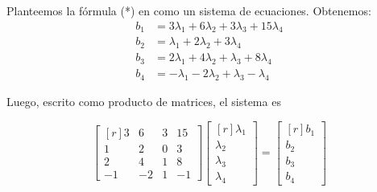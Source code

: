 \documentclass[handout]{beamer} %
\begin{document}
    \begin{frame}
        Planteemos la fórmula (*) en como un sistema de ecuaciones. Obtenemos:
        \begin{align*}
            b_1&=3\lambda_1+6\lambda_2+3\lambda_3+15\lambda_4\\
            b_2&=\lambda_1+2\lambda_2+3\lambda_4\\
            b_3&=2\lambda_1+4\lambda_2+ \lambda_3+8\lambda_4\\
            b_4&=-\lambda_1-2\lambda_2+\lambda_3-\lambda_4
        \end{align*}
        
        \pause Luego, escrito como producto de matrices, el sistema es

        \begin{equation*}
            \begin{bmatrix*}[r]    
        3&6&3&15\\
        1&2&0&3\\
        2&4&1&8\\
        -1&-2&1&-1
    \end{bmatrix*}
        \begin{bmatrix*}[r]
        \lambda_1\\
        \lambda_2\\
        \lambda_3\\
        \lambda_4
    \end{bmatrix*}
        =
        \begin{bmatrix*}[r]
        b_1\\
        b_2\\
        b_3\\
        b_4 
    \end{bmatrix*}
    \end{equation*}

    \end{frame}
\end{document}
